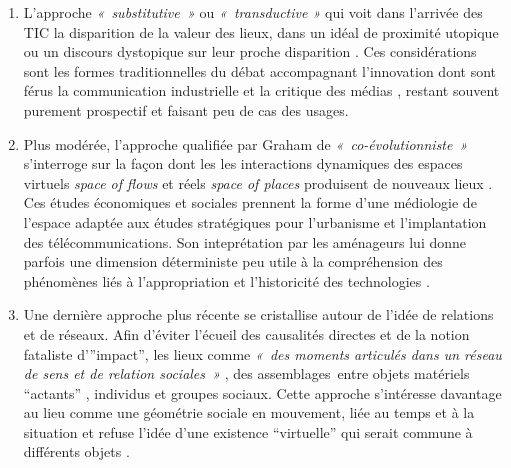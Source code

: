 \begin{enumerate}

\item L’approche \textit{« substitutive »} ou \textit{« transductive »} qui voit dans l’arrivée des TIC la disparition de la valeur des lieux, dans un idéal de proximité utopique \citep{McLuhan1962} ou un discours dystopique sur leur proche disparition \citep{Virilio1998, Auge1995}. Ces considérations sont les formes traditionnelles du débat accompagnant l’innovation dont sont férus la communication industrielle et la critique des médias \citep{Ramonet2001}, restant souvent purement prospectif et faisant peu de cas des usages.

\item Plus modérée, l’approche qualifiée par Graham de \textit{« co-évolutionniste »} s’interroge sur la façon dont les les interactions dynamiques des espaces virtuels \textit{space of flows} et réels \textit{space of places} \citep{Castells2009} produisent de nouveaux lieux . Ces études économiques et sociales prennent la forme d’une médiologie de l’espace adaptée aux études stratégiques pour l’urbanisme et l’implantation des télécommunications. Son inteprétation par les aménageurs lui donne parfois une dimension déterministe peu utile à la compréhension des phénomènes liés à l’appropriation et l’historicité des technologies \citep{Offner1993}.

\item Une dernière approche plus récente se cristallise autour de l’idée de relations et de réseaux. Afin d’éviter l’écueil des causalités directes et de la notion fataliste d’”impact”, les lieux comme \textit{« des moments articulés dans un réseau de sens et de relation sociales »} \citep{Massey1993}, des assemblages entre objets matériels “actants” \citep{Latour1996}, individus et groupes sociaux. Cette approche s’intéresse davantage au lieu comme une géométrie sociale en mouvement, liée au temps et à la situation \citep{May2001} et refuse l’idée d’une existence “virtuelle” qui serait commune à différents objets \citep{Bingham1996}.

\end{enumerate}

